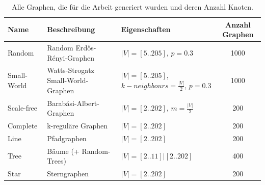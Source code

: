 \begin{table}[H]
    \caption{\label{data-table}Alle Graphen, die für die Arbeit generiert wurden und deren Anzahl Knoten.}
    \begin{adjustbox}{minipage=\textwidth, center}
        \scriptsize
        \begin{tabularx}{\textwidth}{|l|X|X|c|}
            \hline
            \textbf{Name} & \textbf{Beschreibung}              & \textbf{Eigenschaften}                                                             & \textbf{Anzahl Graphen} \\
            \hline
            Random        & Random Erdős-Rényi-Graphen         & $ |V| = [5..205] $, \newline $ p = 0.3 $                                            & 1000                     \\
            \hline
            Small-World   & Watts-Strogatz Small-World-Graphen & $ |V| = [5..205] $, \newline $ k-neighbours = \frac{|V|}{2} $, \newline $ p = 0.3 $ & 1000                     \\
            \hline
            Scale-free    & Barabási-Albert-Graphen            & $ |V| = [2..202] $, \newline $ m = \frac{|V|}{2} $                                 & 200                      \\
            \hline
            Complete      & k-reguläre Graphen                & $ |V| = [2..202] $                                                                 & 200                      \\
            \hline
            Line          & Pfadgraphen                       & $ |V| = [2..202] $                                                                 & 200                      \\
            \hline
            Tree          & Bäume (+ Random-Trees)             & $ |V| = [2..11] | [2..202]$                                                          & 400                     \\
            \hline
            Star          & Sterngraphen                      & $ |V| = [2..202] $                                                                 & 200                      \\
            \hline
        \end{tabularx}
    \end{adjustbox}
\end{table}

